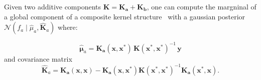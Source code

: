 \documentclass{article} %
\newcommand{\xbf}{\mathbf{x}}
\newcommand{\ybf}{\mathbf{y}}
\begin{document}

Given two additive components $\mathbf{K} = \mathbf{K_a} + \mathbf{K_b}$, one can compute the margninal of a global component of a composite kernel structure~\citep{benavoli2015gaussian} with a gaussian posterior $\mathcal{N}(f_a \mid \hat{\mu}_a,\hat{\mathbf{K}}_a)$  where:

\begin{equation}
\label{eq:marginalComponentMean}
\hat{\bm\mu}_a   = \mathbf{K_a}(\xbf,\xbf^*)\, \mathbf{K}(\xbf^*,\xbf^*)^{-1}\, \ybf
\end{equation}
and covariance matrix
\begin{equation}
\label{eq:marginalComponentCovariance}
\hat{\mathbf{K}}_a =   \mathbf{K_a}(\xbf,\xbf) -  \mathbf{K_a}(\xbf,\xbf^*)\mathbf{K}(\xbf^*,\xbf^*)^{-1} \mathbf{K_a}(\xbf^*,\xbf).
\end{equation}
\end{document}

